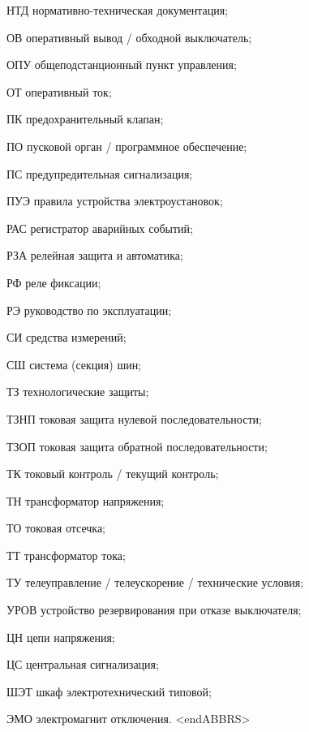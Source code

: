 \begin{list}{}
\item[НТД] нормативно-техническая документация;
\item[ОВ] оперативный вывод / обходной выключатель;
\item[ОПУ] общеподстанционный пункт управления;
\item[ОТ] оперативный ток;
\item[ПК] предохранительный клапан;
\item[ПО] пусковой орган / программное обеспечение;
\item[ПС] предупредительная сигнализация;
\item[ПУЭ] правила устройства электроустановок;
\item[РАС] регистратор аварийных событий;
\item[РЗА] релейная защита и автоматика;
\item[РФ] реле фиксации;
\item[РЭ] руководство по эксплуатации;
\item[СИ] средства измерений;
\item[СШ] система (секция) шин;
\item[ТЗ] технологические защиты;
\item[ТЗНП] токовая защита нулевой последовательности;
\item[ТЗОП] токовая защита обратной последовательности;
\item[ТК] токовый контроль / текущий контроль;
\item[ТН] трансформатор напряжения;
\item[ТО] токовая отсечка;
\item[ТТ] трансформатор тока;
\item[ТУ] телеуправление / телеускорение / технические условия;
\item[УРОВ] устройство резервирования при отказе выключателя;
\item[ЦН] цепи напряжения;
\item[ЦС] центральная сигнализация;
\item[ШЭТ] шкаф электротехнический типовой;
\item[ЭМО] электромагнит отключения.
{\color{white}\fontsize{0.1pt}{0.1pt}\selectfont<endABBRS>}
\end{list}

